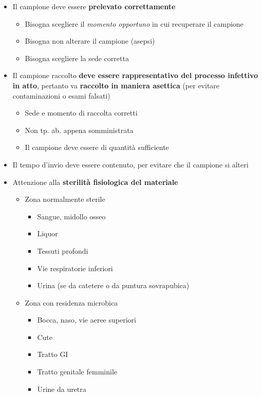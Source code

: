 \documentclass[italian,]{article}
\providecommand{\tightlist}{%
  \setlength{\itemsep}{0pt}\setlength{\parskip}{0pt}}
\begin{document}
\begin{itemize}
\tightlist
\item
  Il campione deve essere \textbf{prelevato correttamente}

  \begin{itemize}
  \tightlist
  \item
    Bisogna scegliere il \emph{momento opportuno} in cui recuperare il
    campione
  \item
    Bisogna non alterare il campione (asepsi)
  \item
    Bisogna scegliere la sede corretta
  \end{itemize}
\item
  Il campione raccolto \textbf{deve essere rappresentativo del processo
  infettivo in atto}, pertanto va \textbf{raccolto in maniera asettica}
  (per evitare contaminazioni o esami falsati)

  \begin{itemize}
  \tightlist
  \item
    Sede e momento di raccolta corretti
  \item
    Non tp. ab. appena somministrata
  \item
    Il campione deve essere di quantità sufficiente
  \end{itemize}
\item
  Il tempo d'invio deve essere contenuto, per evitare che il campione si
  alteri
\item
  Attenzione alla \textbf{sterilità fisiologica del materiale}

  \begin{itemize}
  \tightlist
  \item
    Zona normalmente sterile

    \begin{itemize}
    \tightlist
    \item
      Sangue, midollo osseo
    \item
      Liquor
    \item
      Tessuti profondi
    \item
      Vie respiratorie inferiori
    \item
      Urina (se da catetere o da puntura sovrapubica)
    \end{itemize}
  \item
    Zona con residenza microbica

    \begin{itemize}
    \tightlist
    \item
      Bocca, naso, vie aeree superiori
    \item
      Cute
    \item
      Tratto GI
    \item
      Tratto genitale femminile
    \item
      Urine da uretra
    \end{itemize}
  \end{itemize}
\end{itemize}
\end{document}
